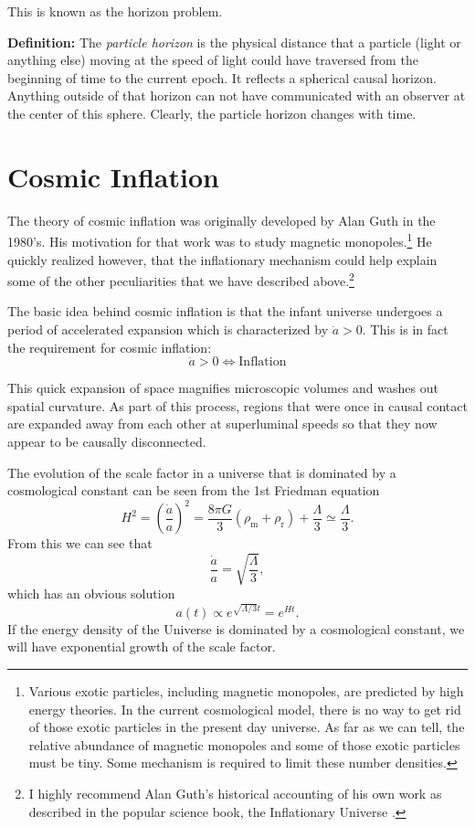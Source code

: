 \documentclass[a4paper,12pt]{article}
\theoremstyle{remark}
\newcommand{\mrm}[1]{\mathrm{#1}}
\renewcommand{\=}[1]{\stackrel{#1}{=}} %
\theoremstyle{plain}
\theoremstyle{definition}
\begin{document}
This is known as the horizon problem.

\textbf{Definition:} The \textit{particle horizon} is the physical distance that a particle (light or anything else) moving at the speed of light could have traversed from the beginning of time to the current epoch. It reflects a spherical causal horizon. Anything outside of that horizon can not have communicated with an observer at the center of this sphere. Clearly, the particle horizon changes with time. 

\section{Cosmic Inflation}

The theory of cosmic inflation was originally developed by Alan Guth in the 1980's. His motivation for that work was to study magnetic monopoles.\footnote{Various exotic particles, including magnetic monopoles, are predicted by high energy theories. In the current cosmological model, there is no way to get rid of those exotic particles in the present day universe. As far as we can tell, the relative abundance of magnetic monopoles and some of those exotic particles must be tiny. Some mechanism is required to limit these number densities.} He quickly realized however, that the inflationary mechanism could help explain some of the other peculiarities that we have described above.\footnote{I highly recommend Alan Guth's historical accounting of his own work as described in the popular science book, the Inflationary Universe \cite{Guth1997}.}

The basic idea behind cosmic inflation is that the infant universe undergoes a period of accelerated expansion which is characterized by $\ddot{a} > 0$. This is in fact the requirement for cosmic inflation:
\begin{equation}
\ddot{a} > 0 \Leftrightarrow \mrm{Inflation}
\end{equation}

This quick expansion of space magnifies microscopic volumes and washes out spatial curvature. As part of this process, regions that were once in causal contact are expanded away from each other at superluminal speeds so that they now appear to be causally disconnected. 

The evolution of the scale factor in a universe that is dominated by a cosmological constant can be seen from the 1st Friedman equation
\begin{equation}
H^{2} = \left( \frac{\dot{a}}{a} \right) ^{2} = \frac{8 \pi G}{3}(\rho _\mrm{m} + \rho _\mrm{r}) + \frac{\Lambda}{3} \simeq \frac{\Lambda}{3}.
\end{equation}
From this we can see that
\begin{equation}
\frac{\dot{a}}{a} = \sqrt{ \frac{\Lambda}{3} },
\end{equation}
which has an obvious solution
\begin{equation}
a(t) \propto e ^{\sqrt{\Lambda/3} t} = e^{Ht}.
\label{eq:eHt}
\end{equation}
If the energy density of the Universe is dominated by a cosmological constant, we will have exponential growth of the scale factor. 
\end{document}
